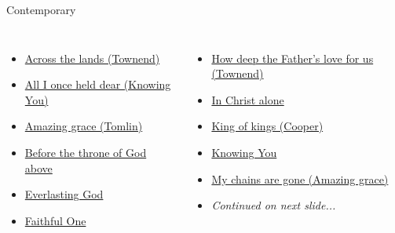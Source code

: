 \documentclass{beamer}
\begin{document}
\begin{frame}[t]{Contemporary}
\begin{columns}[t]
        \begin{itemize}
    \item \hyperlink{Across the lands["You're the Word of God the Father"](Townend)}{Across the lands (Townend)} \phantom{ 1 1 1 1 1}
    \item \hyperlink{Knowing You['All I once held dear']}{All I once held dear (Knowing You)} \phantom{ 1}
    \item \hyperlink{Amazing grace['My chains are gone'](Tomlin)}{Amazing grace (Tomlin)} \phantom{ 1 1 1 1 1 1 1}
    \item \hyperlink{Before the throne of God above[]}{Before the throne of God above } \phantom{ 1 1}
    \item \hyperlink{Everlasting God['Strength will rise']}{Everlasting God } \phantom{ 1 1 1 1 1 1 1 1 1 1}
                            \item \hyperlink{Faithful One[]}{Faithful One } \phantom{ 1 1 1 1 1 1 1 1 1 1 1}
\end{itemize}
        \begin{itemize}
                                            \item \hyperlink{How deep the Father's love for us[](Townend)}{How deep the Father's love for us (Townend)} \phantom{}
            \item \hyperlink{In Christ alone[]}{In Christ alone } \phantom{ 1 1 1 1 1 1 1 1 1 1}
    \item \hyperlink{King of kings[](Cooper)}{King of kings (Cooper)} \phantom{ 1 1 1 1 1 1 1}
    \item \hyperlink{Knowing You['All I once held dear']}{Knowing You } \phantom{ 1 1 1 1 1 1 1 1 1 1 1 1}
                            \item \hyperlink{Amazing grace['My chains are gone'](Tomlin)}{My chains are gone (Amazing grace)} \phantom{ 1}
    \item[] \textit{Continued on next slide...}
            \end{itemize}
            \end{columns}
            \end{frame}
\end{document}
